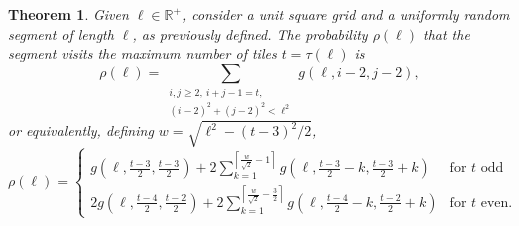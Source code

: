 \documentclass[12pt, a4paper]{article}
\newcommand{\funt}{\tau} %
\newcommand{\probmax}{\rho} %
\newcommand{\len}{\ell} %
\newcommand{\tiles}{t} %
\newtheorem{theorem}{Theorem}%
\begin{document}
\begin{theorem}
\label{theo: probmax, sq}
Given $\len \in \mathbb R^+$, consider a unit square grid and a uniformly random segment of length $\len$, as previously defined. The probability $\probmax(\len)$ that the segment visits the maximum number of tiles $\tiles= \funt(\len)$ is
\begin{equation}
\label{eq: probmax impl}
\probmax(\len) = \sum_{\substack{i,j \geq 2,\ %
i+j-1=\tiles,\\
(i-2)^2+(j-2)^2<\len^2
}} g\left(\len, i-2, j-2 \right),
\end{equation}
or equivalently, defining $w = \sqrt{\len^2-(\tiles-3)^2/2}$,
\begin{equation}
\label{eq: probmax expl}
\probmax(\len) =
\begin{cases}
\displaystyle
g\left(\len, \frac{\tiles-3} 2, \frac{\tiles-3} 2 \right) +
2 \sum_{k=1}^{\left\lceil \frac w {\sqrt{2}} - 1 \right\rceil} g\left(\len, \frac{\tiles-3} 2 - k, \frac{\tiles-3} 2 + k \right) &\text{for $\tiles$ odd} \\[6mm] %
\displaystyle
2 g\left(\len, \frac{\tiles-4} 2, \frac{\tiles-2} 2 \right) +
2 \sum_{k=1}^{\left\lceil \frac w {\sqrt{2}} - \frac 3 2 \right\rceil} g\left(\len, \frac{\tiles-4} 2 - k, \frac{\tiles-2} 2 + k \right) &\text{for $\tiles$ even}.
\end{cases}
\end{equation}
\end{theorem}
\end{document}

